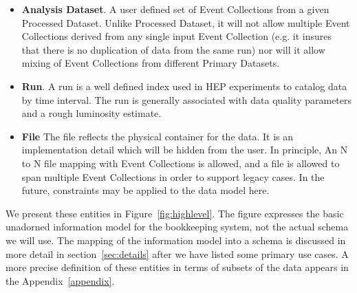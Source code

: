\documentclass{cmspaper}
\begin{document}
\begin{itemize}
\item {\bf Analysis Dataset}. A user defined set of Event Collections 
from a given Processed Dataset. Unlike Processed Dataset, it will not allow 
multiple Event Collections derived from any single input Event Collection
(e.g. it insures that there is no duplication of data from the same run) nor 
will it allow mixing of Event Collections from different Primary Datasets.

\item {\bf Run}.  A run is a well defined index used in HEP experiments to 
catalog data by time interval. The run is generally associated with data
quality parameters and a rough luminosity estimate.

\item {\bf File}  The file reflects the physical container for the data. It is
an implementation detail which will be hidden from the user.  In principle,
An N to N file mapping with Event Collections is allowed, and a file is 
allowed to span multiple Event Collections in order to support legacy 
cases. In the future, constraints may be applied to the data model here.

\end{itemize} 

We present these entities in Figure~\ref{fig:highlevel}.  
The figure expresses the basic unadorned information model
for the bookkeeping system, not the actual schema we will use.
The mapping of the information model into a schema is discussed in more
detail in section~\ref{sec:details} after we have listed some primary use
cases.  A more precise definition of these entities in terms of subsets of
the data appears in the Appendix~\ref{appendix}.
\end{document}
